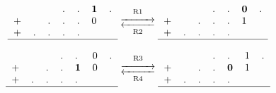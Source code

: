 \documentclass[11pt, openany, a4paper]{article}
\newcommand{\myrightleftarrows}[1]{\mathrel{\substack{\xrightarrow{#1} \\[-.6ex] \xleftarrow{#1}}}}
\newcommand{\longrightleftarrows}{\myrightleftarrows{\rule{1cm}{0cm}}}
\begin{document}
\begin{figure}[hbt]
{\begin{minipage}{0.4\textwidth}



\end{minipage}
\qquad
\begin{minipage}{0.6\textwidth}
\[
\begin{tabular}{lllllll}
&&&.&.&\textbf 1&. \\
+&&.&.&.&0&\\
+&.&.&.&.&&\\
\hline
\end{tabular}
\mathrel{\mathop{\longrightleftarrows}^{\mathrm{R1}}_{\mathrm{R2}}}
\begin{tabular}{lllllll}
&&&.&.&\textbf 0&. \\
+&&.&.&.&1&\\
+&.&.&.&.&&\\
\hline
\end{tabular}
\]

\[
\begin{tabular}{lllllll}
&&&.&.&0&. \\
+&&.&.&\textbf 1&0&\\
+&.&.&.&.&&\\
\hline
\end{tabular}
\mathrel{\mathop{\longrightleftarrows}^{\mathrm{R3}}_{\mathrm{R4}}}
\begin{tabular}{lllllll}
&&&.&.&1&. \\
+&&.&.&\textbf 0&1&\\
+&.&.&.&.&&\\
\hline
\end{tabular}
\]


\end{minipage}}
\end{figure}
\end{document}
